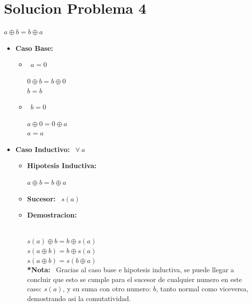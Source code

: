 \documentclass[10pt,a4paper]{article}
\begin{document}
\section*{Solucion Problema 4}
\begin{center}
$ a\oplus b = b\oplus a $
\end{center}
\begin{itemize}
\item \textbf{Caso Base:} 
\begin{itemize}
\item \ $ a=0$
\begin{center}
 $ 0\oplus b = b\oplus 0$
 \
 \\ $ b=b$
\end{center}
\item \ $b=0$
\begin{center}
$ a\oplus 0 = 0\oplus a $
\
\\ $ a=a$
\end{center}

\end{itemize}
\item \textbf{Caso Inductivo: } \ $ \forall \ a  $
\begin{itemize}
\item \textbf{Hipotesis Inductiva: } 
\begin{center}
$ a\oplus b = b\oplus a $
\end{center}
\item \textbf{Sucesor: } \ $s(a)$
\item \textbf{Demostracion: }
\begin{center}
\
\\$ s(a)\oplus b = b\oplus s(a) $
\
\\ $ s(a\oplus b) = b\oplus s(a)$
\
\\ $ s(a\oplus b) = s(b\oplus a)$
\
\\ \textbf{*Nota: } \ Gracias al caso base e hipotesis inductiva, se puede llegar a concluir que esto se cumple para el sucesor de cualquier numero en este caso: $ s(a)$, y su suma con otro numero: $ b $, tanto normal como viceversa, demostrando asi la comutatividad. 
\end{center}
\end{itemize}

\end{itemize}
\end{document}
